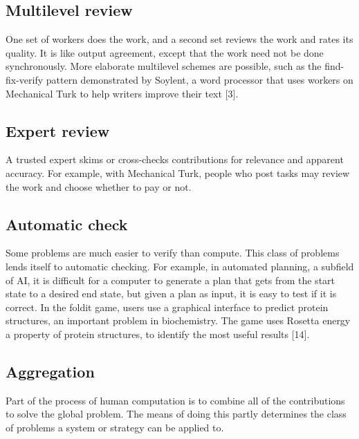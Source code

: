 \documentclass{sig-alternate}
\begin{document}
\subsection*{Multilevel review}
One set of workers does the work, and a second set reviews the work and rates its quality. It is like output agreement, except that the work need not be done synchronously. More elaborate multilevel schemes are possible, such as the find-fix-verify pattern demonstrated by Soylent, a word processor that uses workers on Mechanical Turk to help writers improve their text [3].
\subsection*{Expert review}
A trusted expert skims or cross-checks contributions for relevance and apparent accuracy. For example, with Mechanical Turk, people who post tasks may review the work and choose whether to pay or not.
\subsection*{Automatic check}
Some problems are much easier to verify than compute. This class of problems lends itself to automatic checking. For example, in automated planning, a subfield of AI, it is difficult for a computer to generate a plan that gets from the start state to a desired end state, but given a plan as input, it is easy to test if it is correct. In the foldit game, users use a graphical interface to predict protein structures, an important problem in biochemistry. The game uses Rosetta energy a property of protein structures, to identify the most useful results [14].
\subsection*{Aggregation}
Part of the process of human computation is to combine all of the contributions to solve the global problem. The means of doing this partly determines the class of problems a system or strategy can be applied to.
\end{document}
